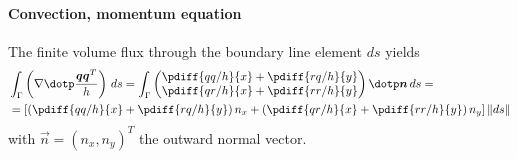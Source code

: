 \paragraph*{Convection, momentum equation}
The finite volume flux through the boundary line element $ds$ yields
\begin{align}
    &\int_\Gamma \left( \nabla \dotp \frac{\vec{q}\vec{q}^T}{h}\right) \, ds =
    \int_\Gamma
    \begin{pmatrix}
        \pdiff{qq/h}{x} + \pdiff{rq/h}{y} \\
        \pdiff{qr/h}{x} + \pdiff{rr/h}{y}
    \end{pmatrix}
    \dotp \vec{n}\, ds
    = \\
    & =
    \left[ \left( \pdiff{qq/h}{x} + \pdiff{rq/h}{y} \right) n_x +
    \left( \pdiff{qr/h}{x} + \pdiff{rr/h}{y} \right) n_y \right] \norm{ds}
\end{align}
with $\vec{n} = (n_x, n_y)^T$ the outward normal vector.

